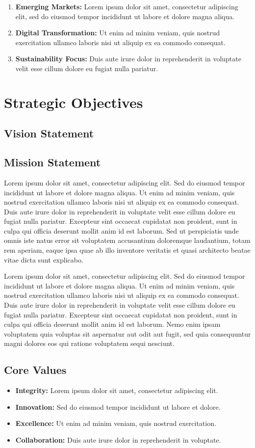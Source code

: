 \documentclass[11pt,a4paper]{article}
\newcommand{\loremtext}[1]{%
  Lorem ipsum dolor sit amet, consectetur adipiscing elit. Sed do eiusmod tempor incididunt ut labore et dolore magna aliqua. Ut enim ad minim veniam, quis nostrud exercitation ullamco laboris nisi ut aliquip ex ea commodo consequat. Duis aute irure dolor in reprehenderit in voluptate velit esse cillum dolore eu fugiat nulla pariatur. Excepteur sint occaecat cupidatat non proident, sunt in culpa qui officia deserunt mollit anim id est laborum.%
}
\begin{document}
\begin{enumerate}
  \item \textbf{Emerging Markets:} Lorem ipsum dolor sit amet, consectetur adipiscing elit, sed do eiusmod tempor incididunt ut labore et dolore magna aliqua.
  \item \textbf{Digital Transformation:} Ut enim ad minim veniam, quis nostrud exercitation ullamco laboris nisi ut aliquip ex ea commodo consequat.
  \item \textbf{Sustainability Focus:} Duis aute irure dolor in reprehenderit in voluptate velit esse cillum dolore eu fugiat nulla pariatur.
\end{enumerate}

\section{Strategic Objectives}

\subsection{Vision Statement}

\begin{center}
\end{center}

\subsection{Mission Statement}

\loremtext{6} Sed ut perspiciatis unde omnis iste natus error sit voluptatem accusantium doloremque laudantium, totam rem aperiam, eaque ipsa quae ab illo inventore veritatis et quasi architecto beatae vitae dicta sunt explicabo.

\loremtext{7} Nemo enim ipsam voluptatem quia voluptas sit aspernatur aut odit aut fugit, sed quia consequuntur magni dolores eos qui ratione voluptatem sequi nesciunt.

\subsection{Core Values}

\begin{itemize}
  \item \textbf{Integrity:} Lorem ipsum dolor sit amet, consectetur adipiscing elit.
  \item \textbf{Innovation:} Sed do eiusmod tempor incididunt ut labore et dolore.
  \item \textbf{Excellence:} Ut enim ad minim veniam, quis nostrud exercitation.
  \item \textbf{Collaboration:} Duis aute irure dolor in reprehenderit in voluptate.
\end{itemize}
\end{document}
